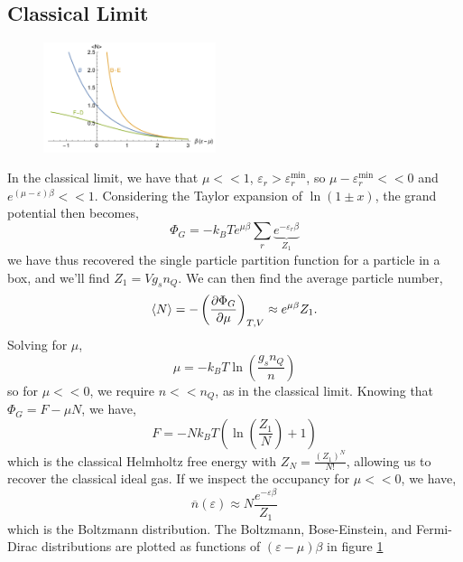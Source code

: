 \documentclass{book}
\begin{document}
\subsection{Classical Limit}
\begin{figure}[h]
	\centering
	\includegraphics[width=0.45\textwidth]{mo.png}
	\caption{}
	\label{fig:mo}
\end{figure}
In the classical limit, we have that $\mu << 1$, $\varepsilon_r > \varepsilon_r^{\text{min}}$, so $\mu - \varepsilon_r^{\text{min}} << 0$ and $e^{(\mu - \varepsilon)\beta} << 1$. Considering the Taylor expansion of $\ln(1\pm x)$, the grand potential then becomes,
\begin{equation}
	\Phi_G = -k_BTe^{\mu\beta}\sum_r\underbrace{e^{-\varepsilon_r \beta}}_{Z_1}
\end{equation}
we have thus recovered the single particle partition function for a particle in a box, and we'll find $Z_1 = Vg_sn_Q$. We can then find the average particle number,
\begin{equation}
	\langle N \rangle = - \left(\pdv{\Phi_G}{\mu}\right)_{T,V} \approx e^{\mu\beta}Z_1.
\end{equation}
Solving for $\mu$,
\begin{equation}
	\mu = -k_BT\ln\left(\frac{g_sn_Q}{n}\right)
\end{equation}
so for $\mu << 0$, we require $n << n_Q$, as in the classical limit. Knowing that $\Phi_G = F - \mu N$, we have,
\begin{equation}
 	F = -Nk_BT\left(\ln\left(\frac{Z_1}{N}\right)+1\right)
\end{equation}
which is the classical Helmholtz free energy with $Z_N = \frac{(Z_1)^N}{N!}$, allowing us to recover the classical ideal gas. If we inspect the occupancy for $\mu << 0$, we have,
\begin{equation}
	\overline{n}(\varepsilon) \approx N\frac{e^{-\varepsilon\beta}}{Z_1}
\end{equation}
which is the Boltzmann distribution. The Boltzmann, Bose-Einstein, and Fermi-Dirac distributions are plotted as functions of $(\varepsilon - \mu)\beta$ in figure \ref{fig:mo}
\end{document}
